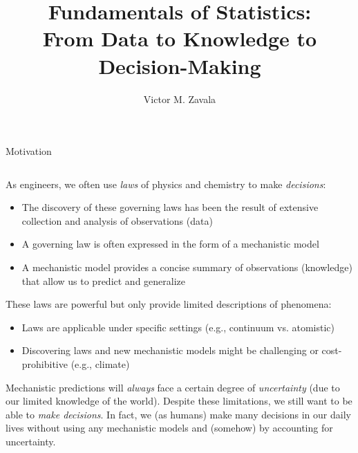 \documentclass[9pt]{beamer}
\title{\LARGE Fundamentals of Statistics: \\ {\large From Data to Knowledge to Decision-Making}}
\author{Victor M. Zavala}
\institute[UW-Madison] 
{\small
  Department of Chemical and Biological Engineering\\
  University of Wisconsin-Madison\\
\medskip
\textit{victor.zavala@wisc.edu}
}
\date{}
\begin{document}
\begin{frame}
  \titlepage
\end{frame}

\begin{frame}{Motivation}
  \begin{columns}
    \begin{column}{\textwidth}
As engineers, we often use {\em laws} of physics and chemistry to make {\em decisions}:
      \begin{block}{}
        \begin{itemize}
      \item The discovery of these governing laws has been the result of extensive collection and analysis of observations (data) 
      \item A governing law is often expressed in the form of a mechanistic model
      \item A mechanistic model provides a concise summary of observations (knowledge) that allow us to predict and generalize
      \end{itemize}
      \end{block}
These laws are powerful but only provide limited descriptions of phenomena:
      \begin{block}{}
      \begin{itemize}
      \item Laws are applicable under specific settings (e.g., continuum vs. atomistic) 
      \item Discovering laws and new mechanistic models might be challenging or cost-prohibitive (e.g., climate)
      \end{itemize}
      \end{block}
      Mechanistic predictions will {\em always} face a certain degree of {\em uncertainty} (due to our limited knowledge of the world). Despite these limitations, we still want to be able to {\em make decisions}. In fact, we (as humans) make many decisions  in our daily lives without using any mechanistic models and (somehow) by accounting for uncertainty. 
    \end{column}
  \end{columns}
\end{frame}
%
\end{document}

